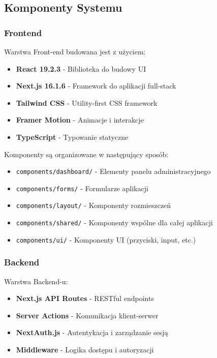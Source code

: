 \documentclass[12pt,a4paper,utf-8]{article}
\begin{document}
\subsection{Komponenty Systemu}

\subsubsection{Frontend}

Warstwa Front-end budowana jest z użyciem:
\begin{itemize}
    \item \textbf{React 19.2.3}  -  Biblioteka do budowy UI
    \item \textbf{Next.js 16.1.6}  -  Framework do aplikacji full-stack
    \item \textbf{Tailwind CSS}  -  Utility-first CSS framework
    \item \textbf{Framer Motion}  -  Animacje i interakcje
    \item \textbf{TypeScript}  -  Typowanie statyczne
\end{itemize}

Komponenty są organizowane w następujący sposób:
\begin{itemize}
    \item \texttt{components/dashboard/}  -  Elementy panelu administracyjnego
    \item \texttt{components/forms/}  -  Formularze aplikacji
    \item \texttt{components/layout/}  -  Komponenty rozmieszczeń
    \item \texttt{components/shared/}  -  Komponenty wspólne dla całej aplikacji
    \item \texttt{components/ui/}  -  Komponenty UI (przyciski, input, etc.)
\end{itemize}

\subsubsection{Backend}

Warstwa Backend-u:
\begin{itemize}
    \item \textbf{Next.js API Routes}  -  RESTful endpoints
    \item \textbf{Server Actions}  -  Komunikacja klient-serwer
    \item \textbf{NextAuth.js}  -  Autentykacja i zarządzanie sesją
    \item \textbf{Middleware}  -  Logika dostępu i autoryzacji
\end{itemize}
\end{document}
